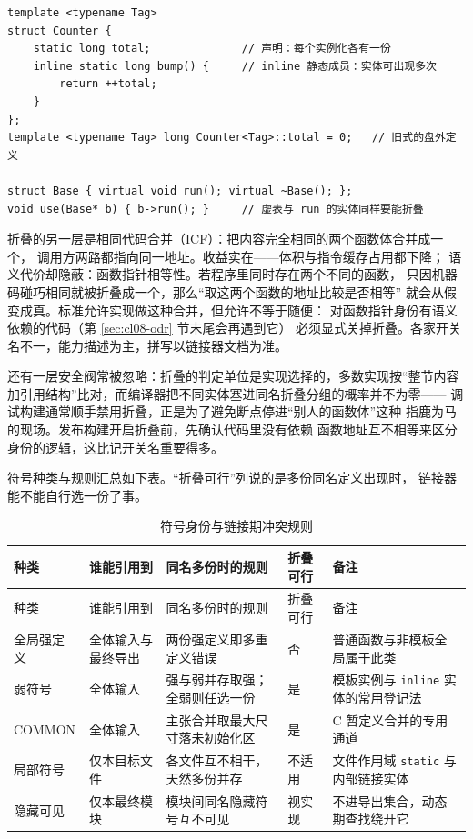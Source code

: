 \documentclass[12pt,a4paper,fontset=fandol]{ctexbook}
\newcommand{\Lang}[1]{\textsf{#1}}
\newcommand{\CL}{\Lang{C}}
\newcommand{\Sw}[1]{\texttt{#1}}
\begin{document}
\begin{lstlisting}[style=cppstyle, caption={必须以“多份可任选”身份存在的定义长什么样}]
template <typename Tag>
struct Counter {
    static long total;              // 声明：每个实例化各有一份
    inline static long bump() {     // inline 静态成员：实体可出现多次
        return ++total;
    }
};
template <typename Tag> long Counter<Tag>::total = 0;   // 旧式的盘外定义

struct Base { virtual void run(); virtual ~Base(); };
void use(Base* b) { b->run(); }     // 虚表与 run 的实体同样要能折叠
\end{lstlisting}

折叠的另一层是相同代码合并（ICF）：把内容完全相同的两个函数体合并成一个，
调用方两路都指向同一地址。收益实在——体积与指令缓存占用都下降；
语义代价却隐蔽：函数指针相等性。若程序里同时存在两个不同的函数，
只因机器码碰巧相同就被折叠成一个，那么“取这两个函数的地址比较是否相等”
就会从假变成真。标准允许实现做这种合并，但允许不等于随便：
对函数指针身份有语义依赖的代码（第 \ref{sec:cl08-odr} 节末尾会再遇到它）
必须显式关掉折叠。各家开关名不一，能力描述为主，拼写以链接器文档为准。

还有一层安全阀常被忽略：折叠的判定单位是实现选择的，多数实现按“整节内容
加引用结构”比对，而编译器把不同实体塞进同名折叠分组的概率并不为零——
调试构建通常顺手禁用折叠，正是为了避免断点停进“别人的函数体”这种
指鹿为马的现场。发布构建开启折叠前，先确认代码里没有依赖
函数地址互不相等来区分身份的逻辑，这比记开关名重要得多。

符号种类与规则汇总如下表。“折叠可行”列说的是多份同名定义出现时，
链接器能不能自行选一份了事。

\begin{longtable}{@{}>{\raggedright\arraybackslash}p{} >{\raggedright\arraybackslash}p{} >{\raggedright\arraybackslash}p{} >{\raggedright\arraybackslash}p{} >{\raggedright\arraybackslash}p{}@{}}
\caption{符号身份与链接期冲突规则}\label{tab:cl08-symbols}\\
\toprule
种类 & 谁能引用到 & 同名多份时的规则 & 折叠可行 & 备注 \\
\midrule
\endfirsthead
\toprule
种类 & 谁能引用到 & 同名多份时的规则 & 折叠可行 & 备注 \\
\midrule
\endhead
\bottomrule
\endfoot
全局强定义 & 全体输入与最终导出 & 两份强定义即多重定义错误 & 否 & 普通函数与非模板全局属于此类 \\
弱符号 & 全体输入 & 强与弱并存取强；全弱则任选一份 & 是 & 模板实例与 \Sw{inline} 实体的常用登记法 \\
COMMON & 全体输入 & 主张合并取最大尺寸落未初始化区 & 是 & \CL{} 暂定义合并的专用通道 \\
局部符号 & 仅本目标文件 & 各文件互不相干，天然多份并存 & 不适用 & 文件作用域 \Sw{static} 与内部链接实体 \\
隐藏可见 & 仅本最终模块 & 模块间同名隐藏符号互不可见 & 视实现 & 不进导出集合，动态期查找绕开它 \\
\end{longtable}
\end{document}
